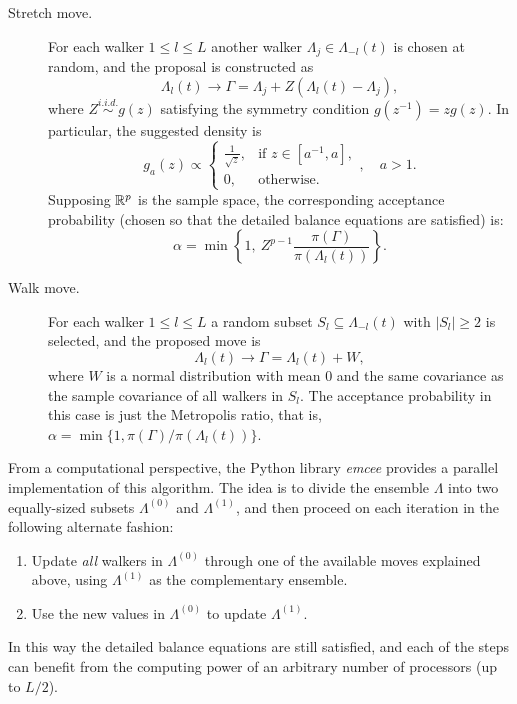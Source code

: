 \begin{description}
    \item[Stretch move.]  For each walker \(1\leq l \leq L\) another walker \(\Lambda_j \in \Lambda_{-l}(t)\) is chosen at random, and the proposal is constructed as
        \[
            \Lambda_l(t) \to \Gamma = \Lambda_j + Z(\Lambda_l(t) - \Lambda_j),
        \]
        where \(Z \stackrel{i.i.d.}{\sim} g(z)\) satisfying the symmetry condition \(g(z^{-1})=zg(z)\). In particular, the suggested density is
        \[
            g_a(z) \propto \begin{cases}
                \frac{1}{\sqrt{z}}, & \text{if } z \in [a^{-1}, a], \\
                0,                  & \text{otherwise.}
            \end{cases}, \quad a > 1.
        \]
        Supposing \(\mathbb{R}^p\) is the sample space, the corresponding acceptance probability (chosen so that the detailed balance equations are satisfied) is:
        \[
            \alpha = \min\left\{1, \ Z^{p-1}\frac{\pi(\Gamma)}{\pi(\Lambda_l(t))}\right\}.
        \]

    \item[Walk move.] For each walker \(1\leq l \leq L\) a random subset \(S_l \subseteq \Lambda_{-l}(t)\) with \(|S_l| \geq 2\) is selected, and the proposed move is
        \[
            \Lambda_l(t) \to \Gamma = \Lambda_l(t) + W,
        \]
        where \(W\) is a normal distribution with mean \(0\) and the same covariance as the sample covariance of all walkers in \(S_l\). The acceptance probability in this case is just the Metropolis ratio, that is, \(\alpha=\min\{1, \pi(\Gamma)/\pi(\Lambda_l(t))\}\).
\end{description}

From a computational perspective, the Python library \textit{emcee} \citep{foreman2013emcee} provides a parallel implementation of this algorithm. The idea is to divide the ensemble \(\Lambda\) into two equally-sized subsets \(\Lambda^{(0)}\) and \(\Lambda^{(1)}\), and then proceed on each iteration in the following alternate fashion:
\begin{enumerate}
    \item Update \textit{all} walkers in \(\Lambda^{(0)}\) through one of the available moves explained above, using \(\Lambda^{(1)}\) as the complementary ensemble.
    \item Use the new values in \(\Lambda^{(0)}\) to update \(\Lambda^{(1)}\).
\end{enumerate}
In this way the detailed balance equations are still satisfied, and each of the steps can benefit from the computing power of an arbitrary number of processors (up to \(L/2\)).

